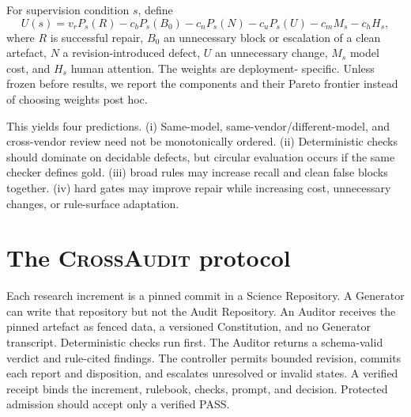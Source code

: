 \documentclass[10pt]{article}
\newcommand{\ca}{\textsc{CrossAudit}}
\begin{document}
For supervision condition $s$, define
\begin{equation}
U(s)=v_rP_s(R)-c_bP_s(B_0)-c_nP_s(N)-c_uP_s(U)-c_mM_s-c_hH_s,
\label{eq:utility}
\end{equation}
where $R$ is successful repair, $B_0$ an unnecessary block or escalation of a
clean artefact, $N$ a revision-introduced defect, $U$ an unnecessary change,
$M_s$ model cost, and $H_s$ human attention. The weights are deployment-
specific. Unless frozen before results, we report the components and their
Pareto frontier instead of choosing weights post hoc.

This yields four predictions. (i) Same-model, same-vendor/different-model, and
cross-vendor review need not be monotonically ordered. (ii) Deterministic
checks should dominate on decidable defects, but circular evaluation occurs if
the same checker defines gold. (iii) broad rules may increase recall and clean
false blocks together. (iv) hard gates may improve repair while increasing
cost, unnecessary changes, or rule-surface adaptation.

\section{The \ca{} protocol}

Each research increment is a pinned commit in a Science Repository. A
Generator can write that repository but not the Audit Repository. An Auditor
receives the pinned artefact as fenced data, a versioned Constitution, and no
Generator transcript. Deterministic checks run first. The Auditor returns a
schema-valid verdict and rule-cited findings. The controller permits bounded
revision, commits each report and disposition, and escalates unresolved or
invalid states. A verified receipt binds the increment, rulebook, checks,
prompt, and decision. Protected admission should accept only a verified PASS.
\end{document}
